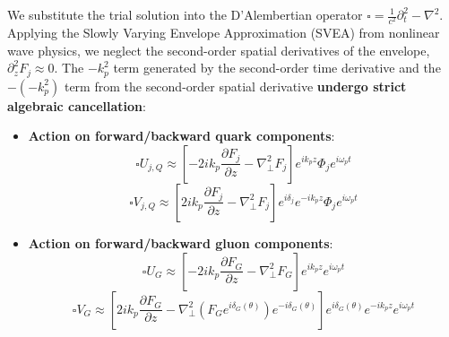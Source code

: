 \documentclass[12pt, a4paper]{article}
\begin{document}
We substitute the trial solution into the D'Alembertian operator $\square = \frac{1}{c^2}\partial_t^2 - \nabla^2$. Applying the Slowly Varying Envelope Approximation (SVEA) from nonlinear wave physics, we neglect the second-order spatial derivatives of the envelope, $\partial_z^2 F_j \approx 0$. The $-k_p^2$ term generated by the second-order time derivative and the $-(-k_p^2)$ term from the second-order spatial derivative \textbf{undergo strict algebraic cancellation}:
\begin{itemize}
    \item \textbf{Action on forward/backward quark components}:
    \begin{equation}
    \square U_{j, Q} \approx \left[ -2ik_p \frac{\partial F_j}{\partial z} - \nabla_\perp^2 F_j \right] e^{ik_p z} \Phi_j e^{i\omega_p t} \label{eq:box_uq}
    \end{equation}
    \begin{equation}
    \square V_{j, Q} \approx \left[ 2ik_p \frac{\partial F_j}{\partial z} - \nabla_\perp^2 F_j \right] e^{i\delta_j} e^{-ik_p z} \Phi_j e^{i\omega_p t} \label{eq:box_vq}
    \end{equation}
    
    \item \textbf{Action on forward/backward gluon components}:
    \begin{equation}
    \square U_G \approx \left[ -2ik_p \frac{\partial F_G}{\partial z} - \nabla_\perp^2 F_G \right] e^{ik_p z} e^{i\omega_p t} \label{eq:box_ug}
    \end{equation}
    \begin{equation}
    \square V_G \approx \left[ 2ik_p \frac{\partial F_G}{\partial z} - \nabla_\perp^2 \left( F_G e^{i\delta_G(\theta)} \right) e^{-i\delta_G(\theta)} \right] e^{i\delta_G(\theta)} e^{-ik_p z} e^{i\omega_p t} \label{eq:box_vg}
    \end{equation}
\end{itemize}
\end{document}
